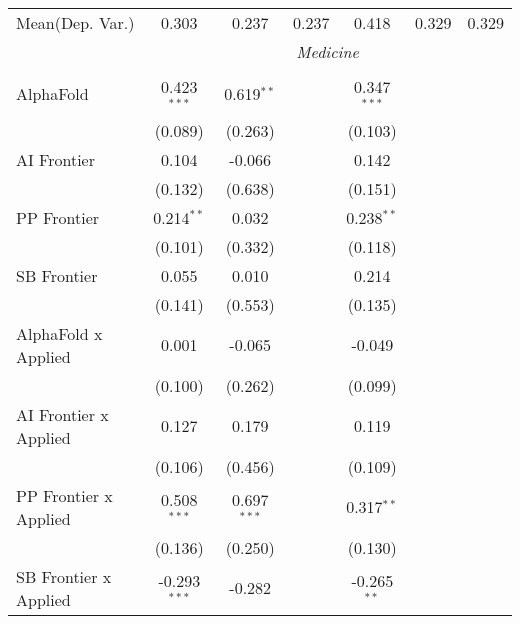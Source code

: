 \begin{tabular}{lcccccc}
Mean(Dep. Var.) & 0.303 & 0.237 & 0.237 & 0.418 & 0.329 & 0.329 \\
 & \multicolumn{6}{c}{\textit{Medicine}} \\ \\
   AlphaFold                      & 0.423$^{***}$  & 0.619$^{**}$  &                & 0.347$^{***}$ &        &   \\   
                                  & (0.089)        & (0.263)       &                & (0.103)       &        &   \\   
   AI Frontier                    & 0.104          & -0.066        &                & 0.142         &        &   \\   
                                  & (0.132)        & (0.638)       &                & (0.151)       &        &   \\   
   PP Frontier                    & 0.214$^{**}$   & 0.032         &                & 0.238$^{**}$  &        &   \\   
                                  & (0.101)        & (0.332)       &                & (0.118)       &        &   \\   
   SB Frontier                    & 0.055          & 0.010         &                & 0.214         &        &   \\   
                                  & (0.141)        & (0.553)       &                & (0.135)       &        &   \\   
   AlphaFold x Applied            & 0.001          & -0.065        &                & -0.049        &        &   \\   
                                  & (0.100)        & (0.262)       &                & (0.099)       &        &   \\   
   AI Frontier x Applied          & 0.127          & 0.179         &                & 0.119         &        &   \\   
                                  & (0.106)        & (0.456)       &                & (0.109)       &        &   \\   
   PP Frontier x Applied          & 0.508$^{***}$  & 0.697$^{***}$ &                & 0.317$^{**}$  &        &   \\   
                                  & (0.136)        & (0.250)       &                & (0.130)       &        &   \\   
   SB Frontier x Applied          & -0.293$^{***}$ & -0.282        &                & -0.265$^{**}$ &        &   \\   

\end{tabular}
